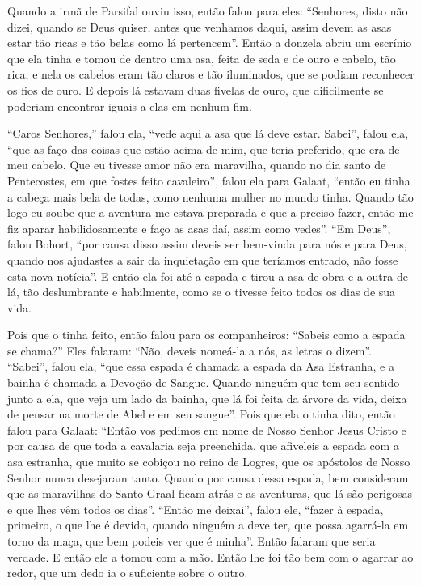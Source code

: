 Quando a irmã de Parsifal ouviu isso, então falou para eles: “Senhores, disto
não dizei, quando se Deus quiser, antes que venhamos daqui, assim devem as asas
estar tão ricas e tão belas como lá pertencem”. Então a donzela abriu um
escrínio que ela tinha e tomou de dentro uma asa, feita de seda e de ouro e
cabelo, tão rica, e nela os cabelos eram tão claros e tão iluminados, que se
podiam reconhecer os fios de ouro. E depois lá estavam duas fivelas de ouro,
que dificilmente se poderiam encontrar iguais a elas em nenhum fim.

“Caros Senhores,” falou ela, “vede aqui a asa que lá deve estar. Sabei”, falou
ela, “que as faço das coisas que estão acima de mim, que teria preferido, que
era de meu cabelo. Que eu tivesse amor não era maravilha, quando no dia santo
de Pentecostes, em que fostes feito cavaleiro”, falou ela para Galaat, “então
eu tinha a cabeça mais bela de todas, como nenhuma mulher no mundo tinha.
Quando tão logo eu soube que a aventura me estava preparada e que a preciso
fazer, então me fiz aparar habilidosamente e faço as asas daí, assim como
vedes”. “Em Deus”, falou Bohort, “por causa disso assim deveis ser bem-vinda
para nós e para Deus, quando nos ajudastes a sair da inquietação em que
teríamos entrado, não fosse esta nova notícia”. E então ela foi até a espada e
tirou a asa de obra e a outra de lá, tão deslumbrante e habilmente, como se o
tivesse feito todos os dias de sua vida.

Pois que o tinha feito, então falou para os companheiros: “Sabeis como a espada
se chama?” Eles falaram: “Não, deveis nomeá-la a nós, as letras o dizem”.
“Sabei”, falou ela, “que essa espada é chamada a espada da Asa Estranha, e a
bainha é chamada a Devoção de Sangue. Quando ninguém que tem seu sentido junto
a ela, que veja um lado da bainha, que lá foi feita da árvore da vida, deixa de
pensar na morte de Abel e em seu sangue”. Pois que ela o tinha dito, então
falou para Galaat: “Então vos pedimos em nome de Nosso Senhor Jesus Cristo e
por causa de que toda a cavalaria seja preenchida, que afiveleis a espada com a
asa estranha, que muito se cobiçou no reino de Logres, que os apóstolos de
Nosso Senhor nunca desejaram tanto. Quando por causa dessa espada, bem
consideram que as maravilhas do Santo Graal ficam atrás e as aventuras, que lá
são perigosas e que lhes vêm todos os dias”. “Então me deixai”, falou
ele, “fazer à espada, primeiro, o que lhe é devido, quando ninguém a deve ter,
que possa agarrá-la em torno da maça, que bem podeis ver que é minha”. Então
falaram que seria verdade. E então ele a tomou com a mão. Então lhe foi tão bem
com o agarrar ao redor, que um dedo ia o suficiente sobre o outro.

